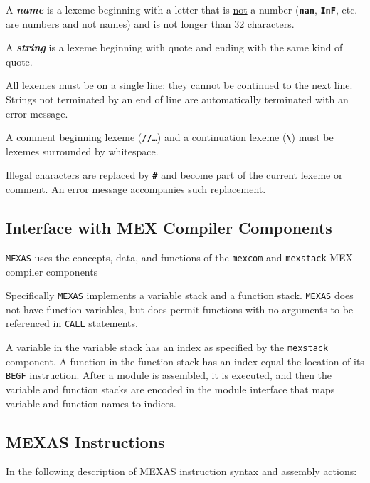 \documentclass[12pt]{article}
\newcommand{\TT}[1]{{\tt \bfseries #1}}
\newcommand{\key}[1]{{\bf \em #1}\index{#1}}
\begin{document}
A \key{name}\label{NAME} is a lexeme beginning with a letter that is
\underline{not} a number (\TT{nan}, \TT{InF}, etc. are numbers
and not names) and is not longer than 32 characters.

A \key{string}\label{STRING} is a lexeme beginning with quote and ending
with the same kind of quote.

All lexemes must be on a single line: they cannot be continued to the
next line.  Strings not terminated by an end of line are automatically
terminated with an error message.

A comment beginning lexeme (\TT{//\ldots}) and a continuation
lexeme (\TT{\textbackslash}) must be lexemes surrounded by whitespace.

Illegal characters are replaced by \TT{\#} and become part of the
current lexeme or comment.  An error message accompanies such replacement.

\subsection{Interface with MEX Compiler Components}
\label{INTERFACE-WITH-MEX-COMPILER-COMPONENTS}

{\tt MEXAS} uses the concepts, data, and functions of the
{\tt mexcom} and {\tt mexstack} MEX compiler components

Specifically {\tt MEXAS} implements a variable stack and a function stack.
{\tt MEXAS} does not have function variables, but does permit functions
with no arguments to be referenced in {\tt CALL} statements.

A variable in the variable stack has an index as specified by the
{\tt mexstack} component.  A function in the function stack
has an index equal the location of its {\tt BEGF} instruction.
After a module is assembled,
it is executed, and then the variable and function stacks are
encoded in the module interface that maps variable and function names
to indices.


\subsection{MEXAS Instructions}
\label{MEXAS-INSTRUCTIONS}

In the following description of MEXAS instruction syntax and
assembly actions:
\end{document}
